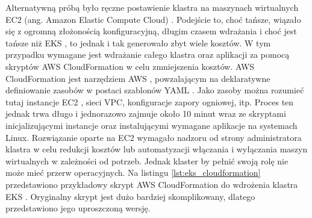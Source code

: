 Alternatywną próbą było ręczne postawienie klastra na maszynach wirtualnych EC2 (ang. Amazon Elastic Compute Cloud) \cite{ec2_docs}. Podejście to, choć tańsze, wiązało się z ogromną złożonością konfiguracyjną, długim czasem wdrażania i choć jest tańsze niż EKS \cite{eks_docs}, to jednak i tak generowało zbyt wiele kosztów. W tym przypadku wymagane jest wdrażanie całego klastra oraz aplikacji za pomocą skryptów AWS CloudFormation \cite{cloudformation_docs} w celu zmniejszenia kosztów. AWS CloudFormation \cite{cloudformation_docs} jest narzędziem AWS \cite{aws_docs}, powzalającym na deklaratywne definiowanie zasobów w postaci szablonów YAML \cite{yaml_spec}. Jako zasoby można rozumieć tutaj instancje EC2 \cite{ec2_docs}, sieci VPC, konfiguracje zapory ogniowej, itp. Proces ten jednak trwa długo i jednorazowo zajmuje około 10 minut wraz ze skryptami inicjalizującymi instancje oraz instalującymi wymagane aplikacje na systemach Linux. Rozwiązanie oparte na EC2 \cite{ec2_docs} wymagało nadzoru od strony administratora klastra w celu redukcji kosztów lub automatyzacji włączania i wyłączania maszyn wirtualnych w zależności od potrzeb. Jednak klaster by pełnić swoją rolę nie może mieć przerw operacyjnych. Na listingu \ref{lst:eks_cloudformation} przedstawiono przykładowy skrypt AWS CloudFormation \cite{cloudformation_docs} do wdrożenia klastra EKS \cite{eks_docs}. Oryginalny skrypt jest dużo bardziej skomplikowany, dlatego przedstawiono jego uproszczoną wersję.

